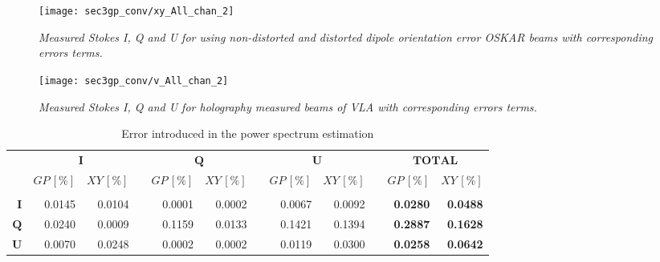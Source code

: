 \documentclass[fleqn,usenatbib]{mnras}
\newcommand{\ra}[1]{\renewcommand{\arraystretch}{#1}}
\begin{document}
\begin{figure*}
\begin{minipage}[H]{\linewidth}
      \centering      
      \texttt{[image: sec3gp\_conv/xy\_All\_chan\_2]}
    \end{minipage}
     \caption{\textit{Measured Stokes I, Q and U  for using non-distorted and distorted dipole orientation error OSKAR beams with corresponding errors terms.}}
	    \label{fig:B1}    
    \end{figure*}


%

\begin{figure*}
\begin{minipage}[H]{\linewidth}
      \centering      
      \texttt{[image: sec3gp\_conv/v\_All\_chan\_2]}
    \end{minipage}
     \caption{\textit{Measured Stokes I, Q and U  for holography measured beams of VLA with corresponding errors terms.}}
	    \label{fig:B2}    
    \end{figure*}
 
 \newpage
\begin{table*}\centering
\caption{Error introduced in the power spectrum estimation}
\label{tbl:excel-table}
\ra{1.3}
\begin{tabular}{@{}rrrcrrcrrcrr@{}}\toprule 
& \multicolumn{2}{c}{$\bm{I}$} & \phantom{abc}& \multicolumn{2}{c}{$\bm{Q}$} & \phantom{abc} & \multicolumn{2}{c}{$\bm{U}$} & \phantom{abc} & \multicolumn{2}{c}{$\bm{TOTAL}$}\\
\cmidrule{2-3}  \cmidrule{5-6} \cmidrule{8-9} \cmidrule{11-12}
& $GP \, [\%]$ & $XY \, [\%]$ && $GP \, [\%] $ & $XY \, [\%] $  && $GP \, [\%]$ & $XY \, [\%]$  && $GP \, [\%]$ & $XY \, [\%]$ \\ \midrule
{}\\
$\bm{I}$ & 0.0145 & 0.0104 && 0.0001 & 0.0002  && 0.0067 & 0.0092 && \textbf{0.0280} & \textbf{0.0488}\\
$\bm{Q}$ & 0.0240 & 0.0009 && 0.1159 & 0.0133 && 0.1421 & 0.1394 && \textbf{0.2887} & \textbf{0.1628}\\
$\bm{U}$ & 0.0070 & 0.0248 && 0.0002 & 0.0002 && 0.0119 & 0.0300  && \textbf{0.0258} & \textbf{0.0642}\\
\bottomrule
\end{tabular}
\end{table*}

\label{lastpage}
\end{document}
